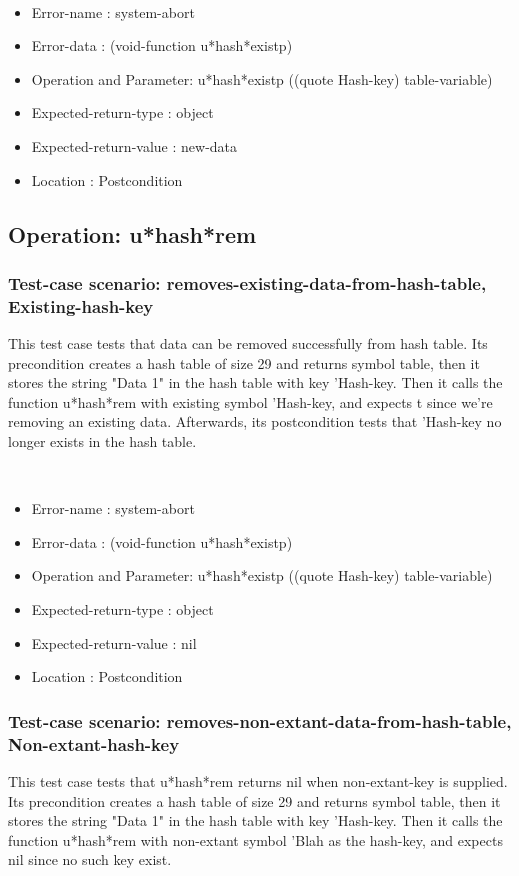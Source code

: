 \
\begin {itemize}
\item 	Error-name             : system-abort
\item Error-data             : (void-function u*hash*existp)
\item Operation and Parameter: u*hash*existp ((quote Hash-key) table-variable)
\item Expected-return-type   : object
\item Expected-return-value  : new-data
\item Location               : Postcondition



\end {itemize}
\subsection {Operation: u*hash*rem}
\subsubsection {Test-case scenario: removes-existing-data-from-hash-table, Existing-hash-key}


This test case tests that data can be removed successfully from hash table.
Its precondition creates a hash table of size 29 and returns symbol table, then it stores the string "Data 1" in the hash table with key 'Hash-key.
Then it calls the function u*hash*rem  with existing symbol 'Hash-key, and expects t since we're removing an existing data.
Afterwards, its postcondition tests that 'Hash-key no longer exists in the hash table.


\
\begin {itemize}
\item 	Error-name             : system-abort
\item Error-data             : (void-function u*hash*existp)
\item Operation and Parameter: u*hash*existp ((quote Hash-key) table-variable)
\item Expected-return-type   : object
\item Expected-return-value  : nil
\item Location               : Postcondition



\end {itemize}
\subsubsection {Test-case scenario: removes-non-extant-data-from-hash-table, Non-extant-hash-key}


This test case tests that u*hash*rem returns nil when non-extant-key is supplied.
Its precondition creates a hash table of size 29 and returns symbol table, then it stores the string "Data 1" in the hash table with key 'Hash-key.
Then it calls the function u*hash*rem  with non-extant symbol 'Blah as the hash-key, and expects nil since no such key exist.


\


